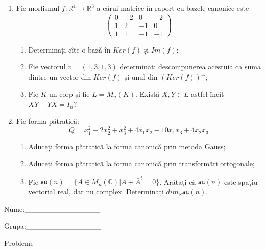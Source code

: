 \documentclass{article}
\begin{document}
\begin{enumerate}
 \item Fie morfismul $f:\mathbb{R}^4 \to \mathbb{R}^3$ a cărui matrice în raport cu bazele canonice este
$$\begin{pmatrix}
0&-2&0&-2\\
1&2&-1&0\\
1&1&-1&-1
\end{pmatrix}$$

\begin{enumerate}
\item Determinați cîte o bază în $Ker(f)$ și $Im(f)$;
\item Fie vectorul $v=(1,3,1,3)$ determinați descompunerea acestuia ca suma dintre un vector din $Ker(f)$ și unul din $(Ker(f))^\perp$;
\item Fie $K$ un corp și fie $L=M_n(K)$. Există $X,Y \in L$ astfel încît $XY-YX=I_n$?  
\end{enumerate}
\item Fie forma pătratică:
$$Q= x_1^2-2x_2^2+x_3^2+4x_1x_2-10x_1x_3+4x_2x_3$$

\begin{enumerate}
\item Aduceți forma pătratică la forma canonică prin metoda Gauss;
\item Aduceți forma pătratică la forma canonică prin transformări ortogonale;
\item Fie $\mathfrak{su}(n)=\{ A \in M_n(\mathbb{C}) | A+\bar{A}^t=0\}$. Arătați că $\mathfrak{su}(n)$ este spațiu vectorial real, dar nu complex.
Determinați $dim_{\mathbb{R}}\mathfrak{su}(n)$.
\end{enumerate}
\end{enumerate}
\newpage
\begin{flushright}
Nume:\_\_\_\_\_\_\_\_\_\_\_\_\_\_
 
 
Grupa:\_\_\_\_\_\_\_\_\_\_\_\_\_\_
\end{flushright}
\begin{center}
\vspace{2cm}
{\Large Probleme}
\vspace{2cm}
\end{center}
\end{document}
